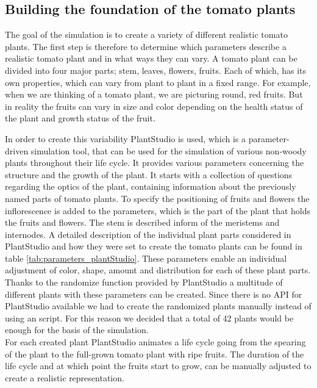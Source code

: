 \graphicspath{{members/cm/figures/}}

\subsection{Building the foundation of the tomato plants}


The goal of the simulation is to create a variety of different realistic tomato plants. The first step is therefore to determine which parameters describe a realistic tomato plant and in what ways they can vary. A tomato plant can be divided into four major parts; stem, leaves, flowers, fruits. Each of which, has its own properties, which can vary from plant to plant in a fixed range. For example, when we are thinking of a tomato plant, we are picturing round, red fruits. But in reality the fruits can vary in size and color depending on the health status of the plant and growth status of the fruit. 

In order to create this variability PlantStudio is used, which is a parameter-driven simulation tool, that can be used for the simulation of various non-woody plants throughout their life cycle. It provides various parameters concerning the structure and the growth of the plant. It starts with a collection of questions regarding the optics of the plant, containing information about the previously named parts of tomato plants. To specify the positioning of fruits and flowers the inflorescence is added to the parameters, which is the part of the plant that holds the fruits and flowers. The stem is described inform of the meristems and internodes. A detailed description of the individual plant parts considered in PlantStudio and how they were set to create the tomato plants can be found in table \ref{tab:parameters_plantStudio}. These parameters enable an individual adjustment of color, shape, amount and distribution for each of these plant parts. Thanks to the randomize function provided by PlantStudio a multitude of different plants with these parameters can be created. Since there is no API for PlantStudio available we had to create the randomized plants manually instead of using an script. For this reason we decided that a total of 42 plants would be enough for the basis of the simulation. \\

For each created plant PlantStudio animates a life cycle going from the spearing of the plant to the full-grown tomato plant with ripe fruits. The duration of the life cycle and at which point the fruits start to grow, can be manually adjusted to create a realistic representation. \\

